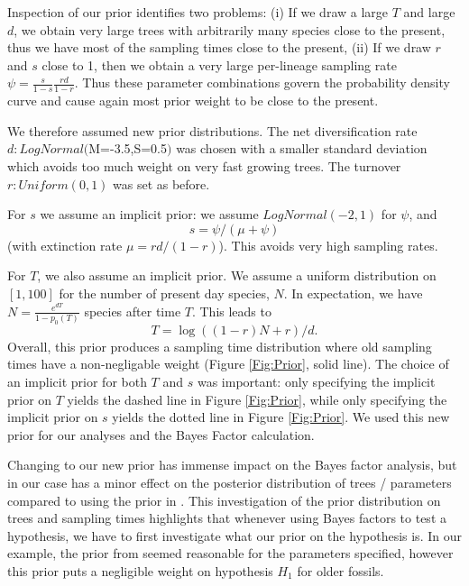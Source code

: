 \documentclass[11pt]{article}
\begin{document}
Inspection of our prior identifies two problems: (i) If we draw a large $T$ and large $d$, we obtain very large trees with arbitrarily many species close to the present, thus we have most of the sampling times close to the present, (ii) If we draw $r$ and $s$ close to 1, then we obtain a very large per-lineage  sampling rate $\psi=\frac{s}{1-s} \frac{rd}{1-r}$. 
Thus these parameter combinations govern the probability density curve and cause again most prior weight to be close to the present.

We therefore assumed new prior distributions. The net diversification rate $d: LogNormal($M=-3.5,S=0.5$)$ was chosen with a smaller standard deviation which avoids too much weight on very fast growing trees. The turnover $r: Uniform(0,1)$ was set as before. 

For $s$ we assume an implicit prior: we assume $LogNormal(-2,1)$ for $\psi$, and $$s=\psi/(\mu+\psi)$$ (with extinction rate $\mu = r d /(1-r)$). This avoids very high sampling rates.

For $T$, we also assume an implicit prior. We assume a uniform distribution on $[1,100]$ for the number of present day species, $N$. In expectation, we have $N=  \frac{e^{d T}}{1-p_0(T)}$ species after time $T$. This leads to $$T=\log((1-r)N +r)/d.$$
Overall, this prior produces a sampling time distribution where old sampling times have a non-negligable weight (Figure \ref{Fig:Prior}, solid line). 
The choice of an implicit prior for both $T$ and $s$ was important: only specifying the implicit prior on $T$ yields the dashed line in Figure \ref{Fig:Prior}, while only specifying the implicit prior on $s$ yields the dotted line in Figure \ref{Fig:Prior}.
We used this new prior for our  analyses and the Bayes Factor calculation.

Changing to our new prior has immense impact on the Bayes factor analysis, but in our case has a minor effect on the posterior distribution of trees / parameters compared to using the prior in  \cite{gavryushkina2015bayesian}.
This investigation of the prior distribution on trees and sampling times highlights that whenever using Bayes factors to test a hypothesis, we have to first investigate what our prior on the hypothesis is. In our example, the  prior from \cite{gavryushkina2015bayesian} seemed reasonable for the parameters specified, however this prior puts a negligible weight on hypothesis $H_1$ for older fossils.
\end{document}
